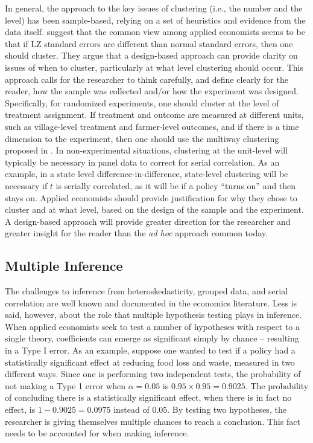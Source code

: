 \documentclass[11pt]{article}
\begin{document}
In general, the approach to the key issues of clustering (i.e., the number and the level) has been sample-based, relying on a set of heuristics and evidence from the data itself. \cite{abadie_when_2017} suggest that the common view among applied economists seems to be that if LZ standard errors are different than normal standard errors, then one should cluster. They argue that a design-based approach can provide clarity on issues of when to cluster, particularly at what level clustering should occur. This approach calls for the researcher to think carefully, and define clearly for the reader, how the sample was collected and/or how the experiment was designed. Specifically, for randomized experiments, one should cluster at the level of treatment assignment. If treatment and outcome are measured at different units, such as village-level treatment and farmer-level outcomes, and if there is a time dimension to the experiment, then one should use the multiway clustering proposed in \cite{cameron_practitioners_2015}. In non-experimental situations, clustering at the unit-level will typically be necessary in panel data to correct for serial correlation. As an example, in a state level difference-in-difference, state-level clustering will be necessary if $t$ is serially correlated, as it will be if a policy ``turns on'' and then stays on. Applied economists should provide justification for why they chose to cluster and at what level, based on the design of the sample and the experiment. A design-based approach will provide greater direction for the researcher and greater insight for the reader than the \emph{ad hoc} approach common today.


\subsection{Multiple Inference}

The challenges to inference from heteroskedasticity, grouped data, and serial correlation are well known and documented in the economics literature. Less is said, however, about the role that multiple hypothesis testing plays in inference. When applied economists seek to test a number of hypotheses with respect to a single theory, coefficients can emerge as significant simply by chance – resulting in a Type I error. As an example, suppose one wanted to test if a policy had a statistically significant effect at reducing food loss and waste, measured in two different ways. Since one is performing two independent tests, the probability of not making a Type 1 error when $\alpha = 0.05$ is $0.95 \times 0.95 = 0.9025$. The probability of concluding there is a statistically significant effect, when there is in fact no effect, is $1 - 0.9025 = 0.0975$ instead of $0.05$. By testing two hypotheses, the researcher is giving themselves multiple chances to reach a conclusion. This fact needs to be accounted for when making inference.
\end{document}
